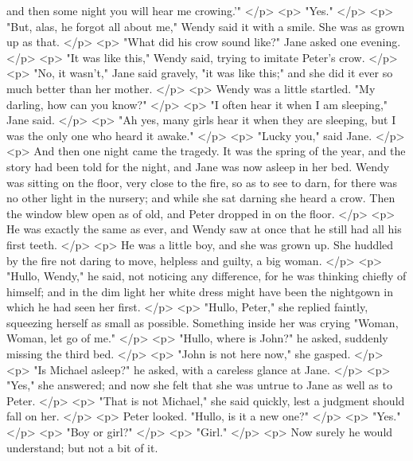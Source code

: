       and then some night you will hear me crowing.'"
    </p>
    <p>
      "Yes."
    </p>
    <p>
      "But, alas, he forgot all about me," Wendy said it with a smile. She was
      as grown up as that.
    </p>
    <p>
      "What did his crow sound like?" Jane asked one evening.
    </p>
    <p>
      "It was like this," Wendy said, trying to imitate Peter's crow.
    </p>
    <p>
      "No, it wasn't," Jane said gravely, "it was like this;" and she did it
      ever so much better than her mother.
    </p>
    <p>
      Wendy was a little startled. "My darling, how can you know?"
    </p>
    <p>
      "I often hear it when I am sleeping," Jane said.
    </p>
    <p>
      "Ah yes, many girls hear it when they are sleeping, but I was the only one
      who heard it awake."
    </p>
    <p>
      "Lucky you," said Jane.
    </p>
    <p>
      And then one night came the tragedy. It was the spring of the year, and
      the story had been told for the night, and Jane was now asleep in her bed.
      Wendy was sitting on the floor, very close to the fire, so as to see to
      darn, for there was no other light in the nursery; and while she sat
      darning she heard a crow. Then the window blew open as of old, and Peter
      dropped in on the floor.
    </p>
    <p>
      He was exactly the same as ever, and Wendy saw at once that he still had
      all his first teeth.
    </p>
    <p>
      He was a little boy, and she was grown up. She huddled by the fire not
      daring to move, helpless and guilty, a big woman.
    </p>
    <p>
      "Hullo, Wendy," he said, not noticing any difference, for he was thinking
      chiefly of himself; and in the dim light her white dress might have been
      the nightgown in which he had seen her first.
    </p>
    <p>
      "Hullo, Peter," she replied faintly, squeezing herself as small as
      possible. Something inside her was crying "Woman, Woman, let go of me."
    </p>
    <p>
      "Hullo, where is John?" he asked, suddenly missing the third bed.
    </p>
    <p>
      "John is not here now," she gasped.
    </p>
    <p>
      "Is Michael asleep?" he asked, with a careless glance at Jane.
    </p>
    <p>
      "Yes," she answered; and now she felt that she was untrue to Jane as well
      as to Peter.
    </p>
    <p>
      "That is not Michael," she said quickly, lest a judgment should fall on
      her.
    </p>
    <p>
      Peter looked. "Hullo, is it a new one?"
    </p>
    <p>
      "Yes."
    </p>
    <p>
      "Boy or girl?"
    </p>
    <p>
      "Girl."
    </p>
    <p>
      Now surely he would understand; but not a bit of it.
